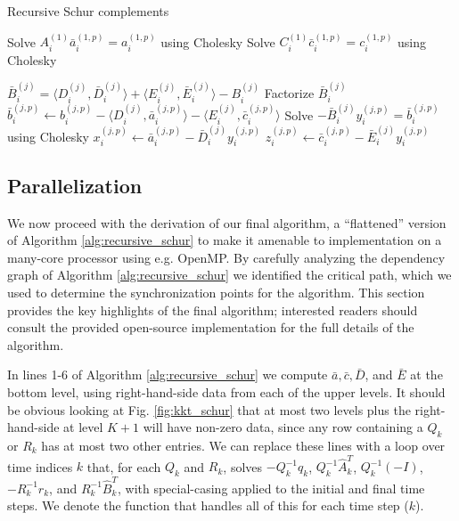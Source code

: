 \documentclass[../root.tex]{subfiles}
\newcommand{\0}{{\transparent{0} \resizebox{\mycellheight}{\mycellheight}{0}}}
\begin{document}
\begin{algorithm}
    \caption{Recursive Schur complements}
    \begin{algorithmic}[1]
        \For {$i \in (0,2^{K-1}]$}
            \For {$p \in (0,K+1]$}
                \State Solve $A_i^{(1)} \bar{a}_i^{(1,p)} = a_i^{(1,p)}$ using Cholesky
                \State Solve $C_i^{(1)} \bar{c}_i^{(1,p)} = c_i^{(1,p)}$ using Cholesky
            \EndFor
        \EndFor

        \For {$j \in (0,K]$}
            \For {$i \in (0,2^{K-j}]$}
                \State $\bar{B}_i^{(j)} = \langle D_i^{(j)}, \bar{D}_i^{(j)} \rangle 
                                        + \langle E_i^{(j)}, \bar{E}_i^{(j)} \rangle
                                        - B_i^{(j)}$
                \State Factorize $\bar{B}_i^{(j)}$
                \For {$p \in (j,K+1]$}
                    \State $\bar{b}_i^{(j,p)} \leftarrow b_i^{(j,p)} 
                        - \langle D_i^{(j)}, \bar{a}_i^{(j,p)} \rangle
                        - \langle E_i^{(j)}, \bar{c}_i^{(j,p)} \rangle$
                    \State Solve $-\bar{B}_i^{(j)} y_i^{(j,p)} = \bar{b}_i^{(j,p)}$ using Cholesky
                    \State $x_i^{(j,p)} \leftarrow \bar{a}_i^{(j,p)} - \bar{D}_i^{(j)} y_i^{(j,p)}$
                    \State $z_i^{(j,p)} \leftarrow \bar{c}_i^{(j,p)} - \bar{E}_i^{(j)} y_i^{(j,p)}$
                \EndFor
            \EndFor 
        \EndFor
    \end{algorithmic} 
    \label{alg:recursive_schur}
\end{algorithm}

\subsection{Parallelization} \label{sec:parallel_lqr}

We now proceed with the derivation of our final algorithm, a ``flattened'' version of
Algorithm \ref{alg:recursive_schur} to make it amenable to implementation on a many-core
processor using e.g. OpenMP. By carefully analyzing the dependency graph of Algorithm 
\ref{alg:recursive_schur} we identified the critical path, which we used to determine the 
synchronization points for the algorithm. This section provides the key highlights of the 
final algorithm; interested readers should consult the provided open-source implementation
for the full details of the algorithm.

In lines 1-6 of Algorithm \ref{alg:recursive_schur} we compute $\bar{a}, \bar{c}, \bar{D}$, and
$\bar{E}$ at the bottom level, using right-hand-side data from each of the upper levels.  It
should be obvious looking at Fig. \ref{fig:kkt_schur} that at most two levels plus the
right-hand-side at level $K+1$ will have non-zero data, since any row containing a $Q_k$ or
$R_k$ has at most two other entries.  We can replace these lines with a loop over time
indices $k$ that, for each $Q_k$ and $R_k$, solves $-Q_k^{-1} q_k$, $Q_k^{-1} \hat{A}_k^T$,
$Q_k^{-1} (-I)$, $-R_k^{-1} r_k$, and $R_k^{-1} \hat{B}_k^{T}$, with special-casing applied
to the initial and final time steps.  We denote the function that handles all of this for
each time step ($k$).
\end{document}
